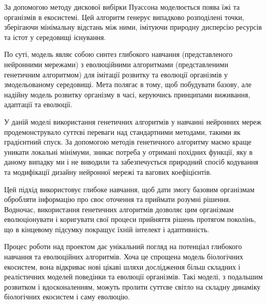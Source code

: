 За допомогою методу дискової вибірки Пуассона
\cite{bridsonFastPoissonDisk2007}
моделюється поява їжі та організмів в екосистемі. 
Цей алгоритм генерує випадково розподілені точки, 
зберігаючи мінімальну відстань між ними, 
імітуючи природну дисперсію ресурсів та 
істот у середовищі існування.







\chapconclude{\ref{chap:theory}}

По суті, модель являє собою синтез глибокого навчання 
(представленого нейронними мережами) 
з еволюційними алгоритмами (представленими генетичним алгоритмом)
для імітації розвитку та еволюції організмів 
у змодельованому середовищі. 
Мета полягає в тому, щоб побудувати базову, 
але надійну модель розвитку організму в часі, 
керуючись принципами виживання, адаптації та еволюції.

У даній моделі використання генетичних алгоритмів у навчанні нейронних мереж 
продемонструвало суттєві переваги над стандартними методами, 
такими як градієнтний спуск. 
За допомогою методів генетичного алгоритму
маємо краще уникати локальні мінімуми,
зникає потреба у отримані похідних
функції, яку в даному випадку ми і не виводили
та забезпечується природний спосіб кодування та 
модифікації дизайну нейронної мережі та вагових коефіцієнтів.

Цей підхід використовує глибоке навчання, 
щоб дати змогу базовим організмам обробляти 
інформацію про своє оточення та приймати розумні рішення. 
Водночас, використання генетичних алгоритмів дозволяє 
цим організмам еволюціонувати і коригувати свої процеси 
прийняття рішень протягом поколінь, 
що в кінцевому підсумку покращує їхній інтелект і адаптивність.

Процес роботи над проектом дає унікальний погляд на 
потенціал глибокого навчання та еволюційних алгоритмів. 
Хоча це спрощена модель біологічних екосистем, 
вона відкриває нові цікаві шляхи дослідження більш складних 
і реалістичних моделей поведінки та еволюції організмів. 
Такі моделі, з подальшим розвитком і вдосконаленням, 
можуть пролити суттєве світло на складну динаміку 
біологічних екосистем і саму еволюцію.
 
